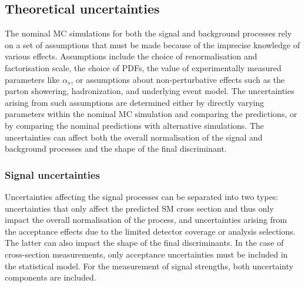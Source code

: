 \subsection{Theoretical uncertainties}
The nominal MC simulations for both the signal and background processes rely on a set of assumptions that must be made because of the imprecise knowledge of various effects. Assumptions include the choice of renormalisation and factorisation scale, the choice of PDFs, the value of experimentally measured parameters like $\alpha_s$, or assumptions about non-perturbative effects such as the parton showering, hadronization, and underlying event model. 
The uncertainties arising from such assumptions are determined either by directly varying parameters within the nominal MC simulation and comparing the predictions, or by comparing the nominal predictions with alternative simulations. 
The uncertainties can affect both the overall normalisation of the signal and background processes and the shape of the final discriminant.  

\subsubsection{Signal uncertainties}
Uncertainties affecting the signal processes can be separated into two types: uncertainties that only affect the predicted SM cross section and thus only impact the overall normalisation of the process, and uncertainties arising from the acceptance effects due to the limited detector coverage or analysis selections. The latter can also impact the shape of the final discriminants. 
In the case of cross-section measurements, only acceptance uncertainties must be included in the statistical model. 
For the measurement of signal strengths, both uncertainty components are included. 


